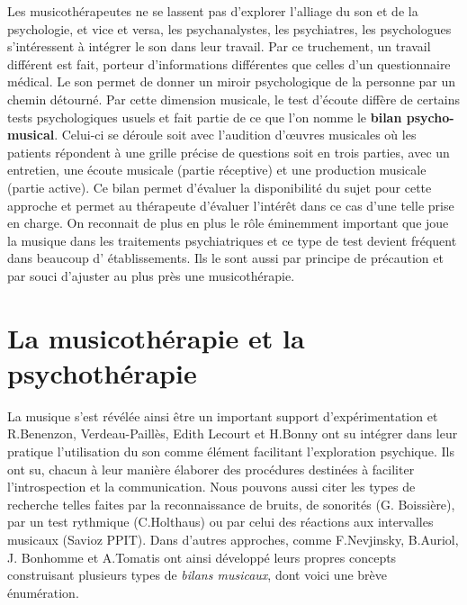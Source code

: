 Les musicothérapeutes ne se lassent pas d'explorer l'alliage du son
 et de la psychologie, et vice
 et versa, les psychanalystes, les psychiatres, les psychologues
 s'intéressent à intégrer le son dans leur travail. Par ce truchement,
 un travail différent est fait, porteur d'informations différentes que
 celles d'un questionnaire médical. Le son permet de donner un miroir
 psychologique de la personne par un chemin détourné. Par cette dimension
 musicale, le test d'écoute diffère de certains tests psychologiques usuels
 et fait partie de ce que l'on nomme le \textbf{ bilan
   psycho-musical}. Celui-ci se déroule soit avec l'audition d'\oe uvres
 musicales où les patients répondent à une grille précise de questions
  soit en trois parties, avec un entretien,
 une écoute musicale (partie réceptive) et une production musicale
 (partie active).
Ce bilan permet d'évaluer la disponibilité du sujet pour cette
approche et permet au thérapeute d'évaluer l'intérêt dans ce cas
d'une telle prise en charge.
 On reconnait de plus en plus le rôle éminemment important que joue la musique
 dans les traitements psychiatriques et ce type de test devient
 fréquent dans beaucoup d' établissements. Ils le sont aussi par principe de précaution et
 par souci d'ajuster au plus près une
 musicothérapie.



  
\section{La musicothérapie et la psychothérapie}
\label{musicothEtpsycho}

	 La musique s'est révélée ainsi être un important support
         d'expérimentation et 
	 R.Benenzon,  Verdeau-Paillès, Edith
         Lecourt et H.Bonny ont su intégrer dans leur pratique l'utilisation du son comme
         élément facilitant l'exploration psychique.
         Ils ont su, chacun à leur manière  élaborer des procédures destinées à faciliter
         l'introspection et la communication.
Nous pouvons aussi citer les types de recherche telles faites par la reconnaissance de
bruits, de sonorités (G. Boissière), par un test rythmique
(C.Holthaus) ou par celui
des réactions aux intervalles musicaux (Savioz PPIT).
		  Dans d'autres approches, comme F.Nevjinsky, B.Auriol, J. Bonhomme
           et A.Tomatis ont ainsi développé leurs propres
           concepts construisant plusieurs types de \emph{bilans musicaux},
           dont voici une brève énumération.
           

